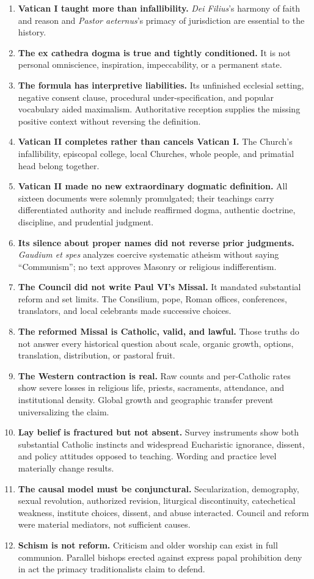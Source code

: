 \begin{enumerate}
\item \textbf{Vatican I taught more than infallibility.} \emph{Dei Filius}'s harmony of faith and reason and \emph{Pastor aeternus}'s primacy of jurisdiction are essential to the history.
\item \textbf{The ex cathedra dogma is true and tightly conditioned.} It is not personal omniscience, inspiration, impeccability, or a permanent state.
\item \textbf{The formula has interpretive liabilities.} Its unfinished ecclesial setting, negative consent clause, procedural under-specification, and popular vocabulary aided maximalism. Authoritative reception supplies the missing positive context without reversing the definition.
\item \textbf{Vatican II completes rather than cancels Vatican I.} The Church's infallibility, episcopal college, local Churches, whole people, and primatial head belong together.
\item \textbf{Vatican II made no new extraordinary dogmatic definition.} All sixteen documents were solemnly promulgated; their teachings carry differentiated authority and include reaffirmed dogma, authentic doctrine, discipline, and prudential judgment.
\item \textbf{Its silence about proper names did not reverse prior judgments.} \emph{Gaudium et spes} analyzes coercive systematic atheism without saying “Communism”; no text approves Masonry or religious indifferentism.
\item \textbf{The Council did not write Paul VI's Missal.} It mandated substantial reform and set limits. The Consilium, pope, Roman offices, conferences, translators, and local celebrants made successive choices.
\item \textbf{The reformed Missal is Catholic, valid, and lawful.} Those truths do not answer every historical question about scale, organic growth, options, translation, distribution, or pastoral fruit.
\item \textbf{The Western contraction is real.} Raw counts and per-Catholic rates show severe losses in religious life, priests, sacraments, attendance, and institutional density. Global growth and geographic transfer prevent universalizing the claim.
\item \textbf{Lay belief is fractured but not absent.} Survey instruments show both substantial Catholic instincts and widespread Eucharistic ignorance, dissent, and policy attitudes opposed to teaching. Wording and practice level materially change results.
\item \textbf{The causal model must be conjunctural.} Secularization, demography, sexual revolution, authorized revision, liturgical discontinuity, catechetical weakness, institute choices, dissent, and abuse interacted. Council and reform were material mediators, not sufficient causes.
\item \textbf{Schism is not reform.} Criticism and older worship can exist in full communion. Parallel bishops erected against express papal prohibition deny in act the primacy traditionalists claim to defend.
\end{enumerate}

